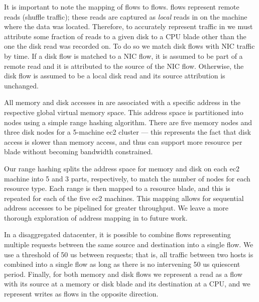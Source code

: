 It is important to note the mapping of \pdis flows to \dis flows. \pdis flows represent remote reads (\ie shuffle traffic); these reads are captured as \emph{local} reads in \dis on the machine where the data was located. Therefore, to accurately represent traffic in \dis we must attribute some fraction of reads to a given disk to a CPU blade other than the one the disk read was recorded on. To do so we match disk flows with NIC traffic by time. If a disk flow is matched to a NIC flow, it is assumed to be part of a remote read and it is attributed to the source of the NIC flow. Otherwise, the disk flow is assumed to be a local disk read and its source attribution is unchanged.

All memory and disk accesses in \dis are associated with a specific address in the respective global virtual memory space. This address space is partitioned into nodes using a simple range hashing algorithm. There are five memory nodes and three disk nodes for a 5-machine ec2 cluster --- this represents the fact that disk access is slower than memory access, and thus can support more resource per blade without becoming bandwidth constrained.

Our range hashing splits the address space for memory and disk on each ec2 machine into 5 and 3 parts, respectively, to match the number of nodes for each resource type. Each range is then mapped to a resource blade, and this is repeated for each of the five ec2 machines. This mapping allows for sequential address accesses to be pipelined for greater throughput. We leave a more thorough exploration of address mapping in \dis to future work.


In a disaggregated datacenter, it is possible to combine flows representing multiple requests between the same source and destination into a single flow. We use a threshold of 50 us between requests; that is, all traffic between two hosts is combined into a single flow as long as there is no intervening 50 us quiescent period. Finally, for both memory and disk flows we represent a read as a flow with its source at a memory or disk blade and its destination at a CPU, and we represent writes as flows in the opposite direction.

